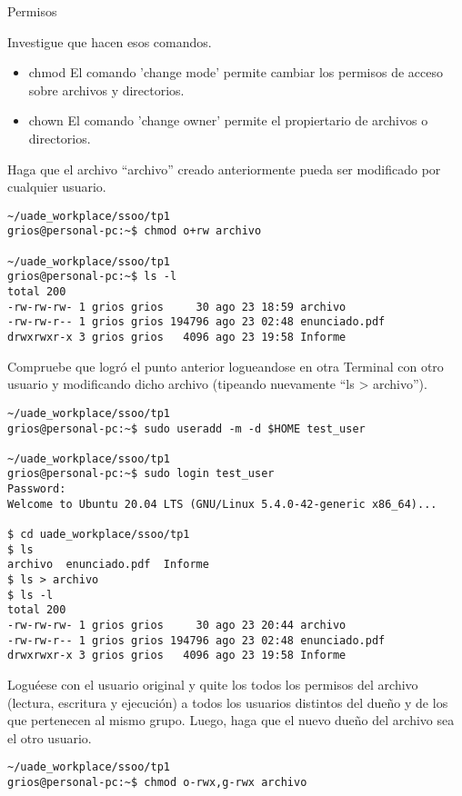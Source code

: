 \begin{section}{Permisos}
\begin{quoting}
Investigue que hacen esos comandos.
\end{quoting}
\begin{itemize}
\item chmod
El comando 'change mode' permite cambiar los permisos de acceso sobre archivos y directorios. 
\item chown
El comando 'change owner' permite el propiertario de archivos o directorios.  
\end{itemize}

\begin{quoting}
Haga que el archivo “archivo” creado anteriormente pueda ser modificado por cualquier usuario.
\end{quoting}
\begin{lstlisting}[style=Ubuntu]
~/uade_workplace/ssoo/tp1
grios@personal-pc:~$ chmod o+rw archivo

~/uade_workplace/ssoo/tp1
grios@personal-pc:~$ ls -l             
total 200
-rw-rw-rw- 1 grios grios     30 ago 23 18:59 archivo
-rw-rw-r-- 1 grios grios 194796 ago 23 02:48 enunciado.pdf
drwxrwxr-x 3 grios grios   4096 ago 23 19:58 Informe
\end{lstlisting}

\begin{quoting}
Compruebe que logró el punto anterior logueandose en otra Terminal con otro usuario y
modificando dicho archivo (tipeando nuevamente “ls > archivo”).
\end{quoting}
\begin{lstlisting}[style=Ubuntu]
~/uade_workplace/ssoo/tp1
grios@personal-pc:~$ sudo useradd -m -d $HOME test_user

~/uade_workplace/ssoo/tp1
grios@personal-pc:~$ sudo login test_user
Password: 
Welcome to Ubuntu 20.04 LTS (GNU/Linux 5.4.0-42-generic x86_64)...

$ cd uade_workplace/ssoo/tp1
$ ls 
archivo  enunciado.pdf	Informe
$ ls > archivo
$ ls -l 
total 200
-rw-rw-rw- 1 grios grios     30 ago 23 20:44 archivo
-rw-rw-r-- 1 grios grios 194796 ago 23 02:48 enunciado.pdf
drwxrwxr-x 3 grios grios   4096 ago 23 19:58 Informe

\end{lstlisting}

\begin{quoting}
Loguéese con el usuario original y quite los todos los permisos del archivo (lectura, escritura y
ejecución) a todos los usuarios distintos del dueño y de los que pertenecen al mismo grupo. Luego, haga que
el nuevo dueño del archivo sea el otro usuario.
\end{quoting}
\begin{lstlisting}[style=Ubuntu]
~/uade_workplace/ssoo/tp1
grios@personal-pc:~$ chmod o-rwx,g-rwx archivo


\end{lstlisting}
\end{section}
